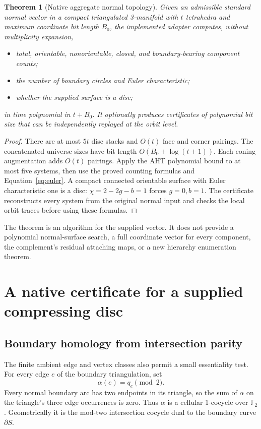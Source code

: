 \documentclass[11pt,a4paper]{article}
\newtheorem{theorem}{Theorem}[section]
\theoremstyle{definition}\newtheorem{definition}[theorem]{Definition}
\theoremstyle{remark}\newtheorem{remark}[theorem]{Remark}
\newcommand{\F}{\mathbb F_2}
\begin{document}
\begin{theorem}[Native aggregate normal topology]\label{thm:normal}
Given an admissible standard normal vector in a compact triangulated
3-manifold with $t$ tetrahedra and maximum coordinate bit length $B_0$,
the implemented adapter computes, without multiplicity expansion,
\begin{itemize}
\item total, orientable, nonorientable, closed, and boundary-bearing
component counts;
\item the number of boundary circles and Euler characteristic;
\item whether the supplied surface is a disc;
\end{itemize}
in time polynomial in $t+B_0$. It optionally produces certificates of
polynomial bit size that can be independently replayed at the orbit level.
\end{theorem}
\begin{proof}
There are at most $5t$ disc stacks and $O(t)$ face and corner pairings.
The concatenated universe sizes have bit length $O(B_0+\log(t+1))$.
Each coning augmentation adds $O(t)$ pairings. Apply the AHT polynomial
bound to at most five systems, then use the proved counting formulas and
Equation~\eqref{eq:euler}. A compact connected orientable surface with
Euler characteristic one is a disc: $\chi=2-2g-b=1$ forces $g=0,b=1$.
The certificate reconstructs every system from the original normal input
and checks the local orbit traces before using these formulas.
\end{proof}

The theorem is an algorithm for the supplied vector. It does not provide a
polynomial normal-surface search, a full coordinate vector for every
component, the complement's residual attaching maps, or a new hierarchy
enumeration theorem.

\section{A native certificate for a supplied compressing disc}
\label{sec:disk}

\subsection{Boundary homology from intersection parity}

The finite ambient edge and vertex classes also permit a small essentiality
test. For every edge $e$ of the boundary triangulation, set
\[
 \alpha(e)=q_e\pmod2.
\]
Every normal boundary arc has two endpoints in its triangle, so the sum of
$\alpha$ on the triangle's three edge occurrences is zero. Thus $\alpha$
is a cellular 1-cocycle over $\F$. Geometrically it is the mod-two
intersection cocycle dual to the boundary curve $\partial S$.
\end{document}
